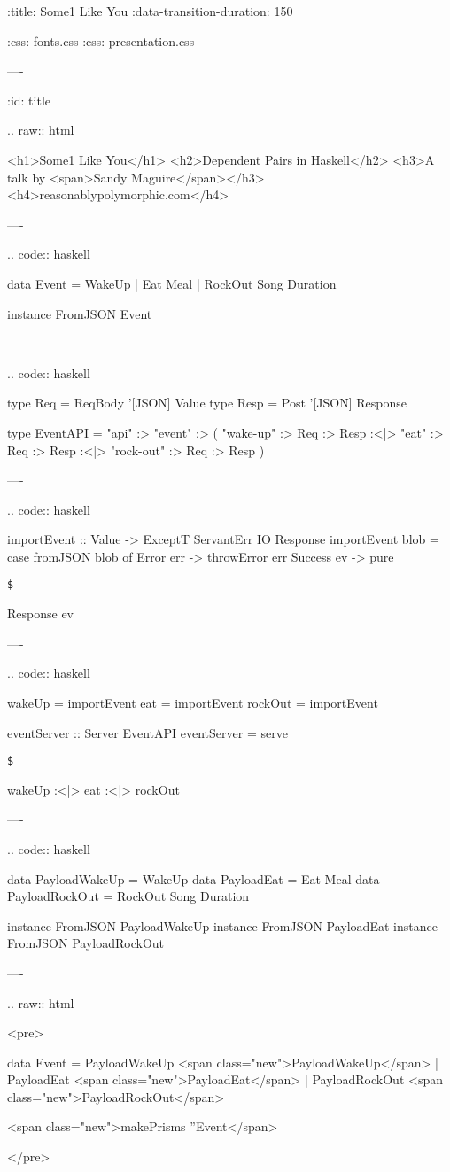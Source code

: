 :title: Some1 Like You
:data-transition-duration: 150

:css: fonts.css
:css: presentation.css

\newcommand{\$}{\begin{verbatim}$\end{verbatim}}
\newcommand{\todo}[2]{#2}
\newcommand{\note}[1]{<span class="new">#1</span>}
\newcommand{\hs}[1]{.. code:: haskell
#1
}
\newcommand{\code}[1]{.. raw:: html

  <pre>
#1
  </pre>
}

----

:id: title

.. raw:: html

  <h1>Some1 Like You</h1>
  <h2>Dependent Pairs in Haskell</h2>
  <h3>A talk by <span>Sandy Maguire</span></h3>
  <h4>reasonablypolymorphic.com</h4>

----

\hs{
  data Event = WakeUp
             | Eat Meal
             | RockOut Song Duration

  instance FromJSON Event
}

----

\hs{
  type Req  = ReqBody '[JSON] Value
  type Resp = Post    '[JSON] Response

  type EventAPI = "api" :> "event" :>
         ( "wake-up"  :> Req :> Resp
      :<|> "eat"      :> Req :> Resp
      :<|> "rock-out" :> Req :> Resp
         )
}

----

\hs{
  importEvent :: Value -> ExceptT ServantErr IO Response
  importEvent blob =
    case fromJSON blob of
      Error   err -> throwError err
      Success ev  -> pure \$ Response ev
}

----

\hs{
  wakeUp  = importEvent
  eat     = importEvent
  rockOut = importEvent

  eventServer :: Server EventAPI
  eventServer = serve \$
    wakeUp :<|> eat :<|> rockOut
}

----

\hs{
  data PayloadWakeUp  = \todo{rename these so they dont clash with datakinds later}{WakeUp}
  data PayloadEat     = Eat Meal
  data PayloadRockOut = RockOut Song Duration

  instance FromJSON PayloadWakeUp
  instance FromJSON PayloadEat
  instance FromJSON PayloadRockOut
}

----

\code{
  data Event = PayloadWakeUp  \note{PayloadWakeUp}
             | PayloadEat     \note{PayloadEat}
             | PayloadRockOut \note{PayloadRockOut}

  \note{makePrisms ''Event}
}

